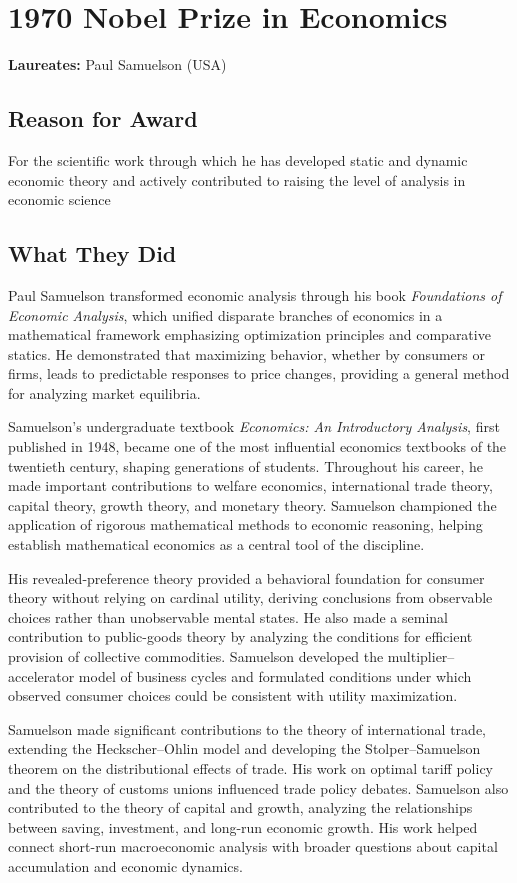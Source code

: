 \chapter{1970 Nobel Prize in Economics}
\textbf{Laureates: }Paul Samuelson (USA)

\section*{Reason for Award}
For the scientific work through which he has developed static and dynamic economic theory and
actively contributed to raising the level of analysis in economic science

\section{What They Did}
Paul Samuelson transformed economic analysis through his book \textit{Foundations of Economic
Analysis}, which unified disparate branches of economics in a mathematical framework emphasizing
optimization principles and comparative statics. He demonstrated that maximizing behavior, whether
by consumers or firms, leads to predictable responses to price changes, providing a general method
for analyzing market equilibria.

Samuelson's undergraduate textbook \textit{Economics: An Introductory Analysis}, first published
in 1948, became one of the most influential economics textbooks of the twentieth century, shaping
generations of students. Throughout his career, he made important contributions to welfare
economics, international trade theory, capital theory, growth theory, and monetary theory.
Samuelson championed the application of rigorous mathematical methods to economic reasoning,
helping establish mathematical economics as a central tool of the discipline.

His revealed-preference theory provided a behavioral foundation for consumer theory without
relying on cardinal utility, deriving conclusions from observable choices rather than unobservable
mental states. He also made a seminal contribution to public-goods theory by analyzing the
conditions for efficient provision of collective commodities. Samuelson developed the
multiplier--accelerator model of business cycles and formulated conditions under which observed
consumer choices could be consistent with utility maximization.

Samuelson made significant contributions to the theory of international trade, extending the
Heckscher--Ohlin model and developing the Stolper--Samuelson theorem on the distributional effects
of trade. His work on optimal tariff policy and the theory of customs unions influenced trade
policy debates. Samuelson also contributed to the theory of capital and growth, analyzing the
relationships between saving, investment, and long-run economic growth. His work helped connect
short-run macroeconomic analysis with broader questions about capital accumulation and economic
dynamics.

